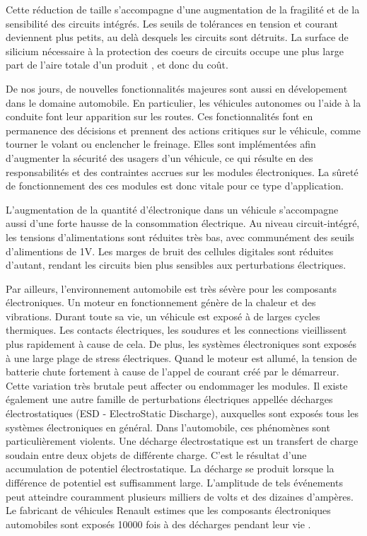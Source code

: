 Cette réduction de taille s'accompagne d'une augmentation de la fragilité et de la sensibilité des circuits intégrés.
Les seuils de tolérances en tension et courant deviennent plus petits, au delà desquels les circuits sont détruits.
La surface de silicium nécessaire à la protection des coeurs de circuits occupe une plus large part de l'aire totale d'un produit  \cite{evolution_technologies}, et donc du coût.

De nos jours, de nouvelles fonctionnalités majeures sont aussi en dévelopement dans le domaine automobile.
En particulier, les véhicules autonomes ou l'aide à la conduite font leur apparition sur les routes.
Ces fonctionnalités font en permanence des décisions et prennent des actions critiques sur le véhicule, comme tourner le volant ou enclencher le freinage.
Elles sont implémentées afin d'augmenter la sécurité des usagers d'un véhicule, ce qui résulte en des responsabilités et des contraintes accrues sur les modules électroniques.
La sûreté de fonctionnement des ces modules est donc vitale pour ce type d'application.

L'augmentation de la quantité d'électronique dans un véhicule s'accompagne aussi d'une forte hausse de la consommation électrique.
Au niveau circuit-intégré, les tensions d'alimentations sont réduites très bas, avec communément des seuils d'alimentions de 1V.
Les marges de bruit des cellules digitales sont réduites d'autant, rendant les circuits bien plus sensibles aux perturbations électriques.

Par ailleurs, l'environnement automobile est très sévère pour les composants électroniques.
Un moteur en fonctionnement génère de la chaleur et des vibrations.
Durant toute sa vie, un véhicule est exposé à de larges cycles thermiques.
Les contacts électriques, les soudures et les connections vieillissent plus rapidement à cause de cela.
De plus, les systèmes électroniques sont exposés à une large plage de stress électriques.
Quand le moteur est allumé, la tension de batterie chute fortement à cause de l'appel de courant créé par le démarreur.
Cette variation très brutale peut affecter ou endommager les modules.
Il existe également une autre famille de perturbations électriques appellée décharges électrostatiques (ESD - ElectroStatic Discharge), auxquelles sont exposés tous les systèmes électroniques en général.
Dans l'automobile, ces phénomènes sont particulièrement violents.
Une décharge électrostatique est un transfert de charge soudain entre deux objets de différente charge.
C'est le résultat d'une accumulation de potentiel électrostatique.
La décharge se produit lorsque la différence de potentiel est suffisamment large.
L'amplitude de tels événements peut atteindre couramment plusieurs milliers de volts et des dizaines d'ampères.
Le fabricant de véhicules Renault estimes que les composants électroniques automobiles sont exposés 10000 fois à des décharges pendant leur vie \cite{Renault-esd}.

